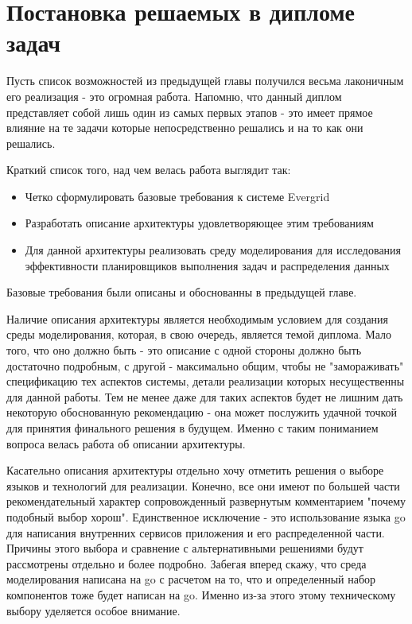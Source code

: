 \chapter{Постановка решаемых в дипломе задач}

Пусть список возможностей из предыдущей главы получился весьма лаконичным его реализация - это огромная работа. Напомню, что данный диплом представляет собой лишь один из самых первых этапов - это имеет прямое влияние на те задачи которые непосредственно решались и на то как они решались.

Краткий список того, над чем велась работа выглядит так:

\begin{itemize}
	\item Четко сформулировать базовые требования к системе Evergrid
	\item Разработать описание архитектуры удовлетворяющее этим требованиям
	\item Для данной архитектуры реализовать среду моделирования для исследования эффективности планировщиков выполнения задач и распределения данных
\end{itemize}

Базовые требования были описаны и обоснованны в предыдущей главе.

Наличие описания архитектуры является необходимым условием для создания среды моделирования, которая, в свою очередь, является темой диплома. Мало того, что оно должно быть - это описание с одной стороны должно быть достаточно подробным, с другой - максимально общим, чтобы не "замораживать" спецификацию тех аспектов системы, детали реализации которых несущественны для данной работы. Тем не менее даже для таких аспектов будет не лишним дать некоторую обоснованную рекомендацию - она может послужить удачной точкой для принятия финального решения в будущем. Именно с таким пониманием вопроса велась работа об описании архитектуры.

Касательно описания архитектуры отдельно хочу отметить решения о выборе языков и технологий для реализации. Конечно, все они имеют по большей части рекомендательный характер сопровожденный развернутым комментарием "почему подобный выбор хорош". Единственное исключение - это использование языка go для написания внутренних сервисов приложения и его распределенной части. Причины этого выбора и сравнение с альтернативными решениями будут рассмотрены отдельно и более подробно. Забегая вперед скажу, что среда моделирования написана на go с расчетом на то, что и определенный набор компонентов тоже будет написан на go. Именно из-за этого этому техническому выбору уделяется особое внимание.

